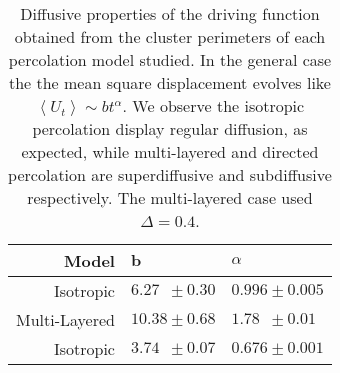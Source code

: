 \begin{table}[t]
\begin{centering}
\begin{tabular}{rll}
\bottomrule[0.1mm]
\toprule[0.1mm]
\textbf{Model}  & $\mathbf{b}$        & \boldmath$\alpha$   \\
\toprule[0.1mm]
Isotropic       & $6.27\,\,\,\pm0.30$ & $0.996\pm0.005$     \\[0.2cm]
Multi-Layered   & $10.38\pm0.68$      & $1.78\,\,\,\pm0.01$ \\[0.2cm]
Isotropic       & $3.74\,\,\,\pm0.07$ & $0.676\pm0.001$     \\[0.2cm]
\bottomrule[0.1mm]
\toprule[0.1mm]
\end{tabular}
\par\end{centering}
\caption{Diffusive properties of the driving function obtained from the cluster
    perimeters of each percolation model studied. In the general case the the
    mean square displacement evolves like $\left\langle U_t\right\rangle\sim
    bt^\alpha$. We observe the isotropic percolation display regular diffusion,
    as expected, while multi-layered and directed percolation are
    superdiffusive and subdiffusive respectively. The multi-layered case used
    $\Delta=0.4$.}
\label{tab:diff}
\end{table}
